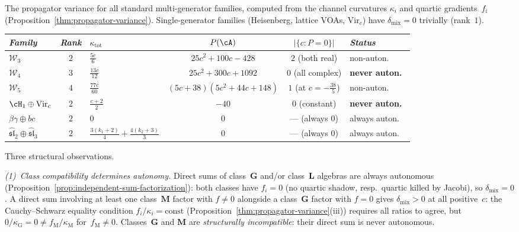 \begin{example}
\label{ex:propagator-variance-landscape}
\ClaimStatusProvedHere
{}
The propagator variance for all standard multi-generator
families, computed from the channel curvatures
$\kappa_i$ and quartic gradients~$f_i$
(Proposition~\ref{thm:propagator-variance}).
Single-generator families (Heisenberg, lattice VOAs,
$\mathrm{Vir}_c$) have $\delta_{\mathrm{mix}} = 0$
trivially (rank~$1$).
\begin{center}
\small
\renewcommand{\arraystretch}{1.3}
\begin{tabular}{@{}lclccl@{}}
\toprule
\emph{Family} & \emph{Rank}
  & $\kappa_{\mathrm{tot}}$ & $P(\cA)$
  & $|\{c : P=0\}|$ & \emph{Status} \\
\midrule
$\mathcal{W}_3$ & $2$
  & $\frac{5c}{6}$ & $25c^2{+}100c{-}428$
  & $2$ (both real)
  & non-auton.\ \\[3pt]
$\mathcal{W}_4$ & $3$
  & $\frac{13c}{12}$
  & $25c^2{+}300c{+}1092$
  & $0$ (all complex)
  & \textbf{never auton.}\ \\[3pt]
$\mathcal{W}_5$ & $4$
  & $\frac{77c}{60}$
  & $(5c{+}38)(5c^2{+}44c{+}148)$
  & $1$ (at $c = -\tfrac{38}{5}$)
  & non-auton.\ \\[3pt]
$\cH_1 \oplus \mathrm{Vir}_c$ & $2$
  & $\frac{c+2}{2}$
  & $-40$
  & $0$ (constant)
  & \textbf{never auton.}\ \\[3pt]
$\beta\gamma \oplus bc$ & $2$
  & $0$
  & $0$
  & --- (always $0$)
  & always auton.\ \\[3pt]
$\hat{\mathfrak{sl}}_2 \oplus \hat{\mathfrak{sl}}_3$ & $2$
  & $\frac{3(k_1{+}2)}{4} + \frac{4(k_2{+}3)}{3}$
  & $0$
  & --- (always $0$)
  & always auton.\ \\
\bottomrule
\end{tabular}
\end{center}
\noindent
Three structural observations.

\emph{(1)~Class compatibility determines autonomy.}
Direct sums of class~$\mathbf{G}$ and/or class~$\mathbf{L}$
algebras are always autonomous
(Proposition~\ref{prop:independent-sum-factorization}):
both classes have $f_i = 0$ (no quartic shadow, resp.\
quartic killed by Jacobi), so $\delta_{\mathrm{mix}} = 0$.
A direct sum involving at least one class~$\mathbf{M}$ factor
with $f \neq 0$ alongside a class~$\mathbf{G}$ factor
with $f = 0$ gives
$\delta_{\mathrm{mix}} > 0$ at all positive~$c$: the
Cauchy--Schwarz equality condition
$f_i/\kappa_i = \mathrm{const}$
(Proposition~\ref{thm:propagator-variance}(iii))
requires all ratios to agree, but
$0/\kappa_{\mathrm{G}} = 0 \neq f_{\mathrm{M}}/\kappa_{\mathrm{M}}$
for~$f_{\mathrm{M}} \neq 0$.
Classes~$\mathbf{G}$ and $\mathbf{M}$ are
\emph{structurally incompatible}: their direct sum
is never autonomous.


\end{example}
